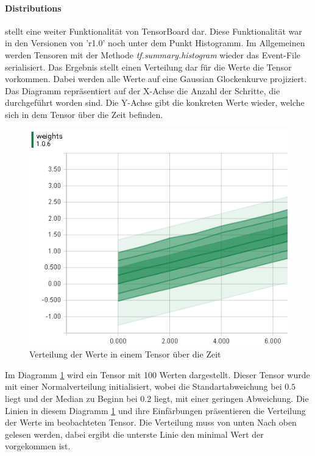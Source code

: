 \paragraph{Distributions} stellt eine weiter Funktionalität von TensorBoard dar.  %
Diese Funktionalität war in den Versionen von 'r1.0' noch unter dem Punkt Histogramm. 
Im Allgemeinen werden Tensoren mit der Methode \textit{tf.summary.histogram} wieder das Event-File serialisiert. 
Das Ergebnis stellt einen Verteilung dar für die Werte die Tensor vorkommen. 
Dabei werden alle Werte auf eine Gaussian Glockenkurve projiziert. 
Das Diagramm repräsentiert auf der X-Achse die Anzahl der Schritte, die durchgeführt worden sind. 
Die Y-Achse gibt die konkreten Werte wieder, welche sich in dem Tensor über die Zeit befinden. 
\begin{figure}
	\centering
	\includegraphics[scale=0.8]{images/Distripution-small.png}
	\caption{Verteilung der Werte in einem Tensor über die Zeit}
	\label{fig:Verteilungsdiagram}
\end{figure}
Im Diagramm \ref{fig:Verteilungsdiagram} wird ein Tensor mit 100 Werten dargestellt. 
Dieser Tensor wurde mit einer Normalverteilung initialisiert, wobei die Standartabweichung bei $0.5$ liegt und der Median zu Beginn bei $0.2$ liegt, mit einer geringen Abweichung. 
Die Linien in diesem Diagramm \ref{fig:Verteilungsdiagram} und ihre Einfärbungen präsentieren die Verteilung der Werte im beobachteten Tensor. 
Die Verteilung muss von unten Nach oben gelesen werden, dabei ergibt die unterste Linie den minimal Wert der vorgekommen ist. 
